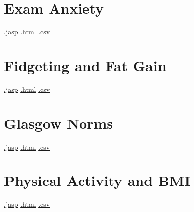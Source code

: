 \documentclass[
  letterpaper,
  DIV=11,
  numbers=noendperiod]{scrreprt}
\begin{document}
\hypertarget{exam-anxiety}{%
\section{Exam Anxiety}\label{exam-anxiety}}

\textbar{}
\href{https://github.com/jasp-stats/jasp-data-library/raw/main/Exam\%20Anxiety/Exam\%20Anxiety.jasp}{.jasp}
\textbar{}
\href{https://htmlpreview.github.io/?https://github.com/jasp-stats/jasp-data-library/blob/main/Exam\%20Anxiety/index.html}{.html}
\textbar{}
\href{https://raw.githubusercontent.com/jasp-stats/jasp-data-library/main/Exam\%20Anxiety/Exam\%20Anxiety.csv}{.csv}

\hypertarget{fidgeting-and-fat-gain}{%
\section{Fidgeting and Fat Gain}\label{fidgeting-and-fat-gain}}

\textbar{}
\href{https://github.com/jasp-stats/jasp-data-library/raw/main/Fidgeting\%20and\%20Fat\%20Gain/Fidgeting\%20and\%20Fat\%20Gain.jasp}{.jasp}
\textbar{}
\href{https://htmlpreview.github.io/?https://github.com/jasp-stats/jasp-data-library/blob/main/Fidgeting\%20and\%20Fat\%20Gain/index.html}{.html}
\textbar{}
\href{https://raw.githubusercontent.com/jasp-stats/jasp-data-library/main/Fidgeting\%20and\%20Fat\%20Gain/Fidgeting\%20and\%20Fat\%20Gain.csv}{.csv}

\hypertarget{glasgow-norms}{%
\section{Glasgow Norms}\label{glasgow-norms}}

\textbar{}
\href{https://github.com/jasp-stats/jasp-data-library/raw/main/Glasgow\%20Norms/Glasgow\%20Norms.jasp}{.jasp}
\textbar{}
\href{https://htmlpreview.github.io/?https://github.com/jasp-stats/jasp-data-library/blob/main/Glasgow\%20Norms/index.html}{.html}
\textbar{}
\href{https://raw.githubusercontent.com/jasp-stats/jasp-data-library/main/Glasgow\%20Norms/Glasgow\%20Norms.csv}{.csv}

\hypertarget{physical-activity-and-bmi}{%
\section{Physical Activity and BMI}\label{physical-activity-and-bmi}}

\textbar{}
\href{https://github.com/jasp-stats/jasp-data-library/raw/main/Physical\%20Activity\%20and\%20BMI/Physical\%20Activity\%20and\%20BMI.jasp}{.jasp}
\textbar{}
\href{https://htmlpreview.github.io/?https://github.com/jasp-stats/jasp-data-library/blob/main/Physical\%20Activity\%20and\%20BMI/index.html}{.html}
\textbar{}
\href{https://raw.githubusercontent.com/jasp-stats/jasp-data-library/main/Physical\%20Activity\%20and\%20BMI/Physical\%20Activity\%20and\%20BMI.csv}{.csv}
\end{document}
